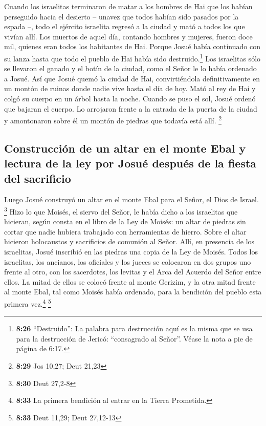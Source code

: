  Cuando los israelitas terminaron de matar a los hombres
de Hai que los habían perseguido hacia el desierto -- unavez que todos
habían sido pasados por la espada --, todo el ejército israelita regresó
a la ciudad y mató a todos los que vivían allí.  Los
muertos de aquel día, contando hombres y mujeres, fueron doce mil,
quienes eran todos los habitantes de Hai.  Porque Josué
había continuado con su lanza hasta que todo el pueblo de Hai había sido
destruido.\footnote{\textbf{8:26} ``Destruido'': La palabra para
  destrucción aquí es la misma que se usa para la destrucción de Jericó:
  ``consagrado al Señor''. Véase la nota a pie de página de 6:17.}
 Los israelitas sólo se llevaron el ganado y el botín de
la ciudad, como el Señor le lo había ordenado a Josué. 
Así que Josué quemó la ciudad de Hai, convirtiéndola definitivamente en
un montón de ruinas donde nadie vive hasta el día de hoy.
 Mató al rey de Hai y colgó su cuerpo en un árbol hasta
la noche. Cuando se puso el sol, Josué ordenó que bajaran el cuerpo. Lo
arrojaron frente a la entrada de la puerta de la ciudad y amontonaron
sobre él un montón de piedras que todavía está allí. \footnote{\textbf{8:29}
  Jos 10,27; Deut 21,23}

\hypertarget{construcciuxf3n-de-un-altar-en-el-monte-ebal-y-lectura-de-la-ley-por-josuuxe9-despuuxe9s-de-la-fiesta-del-sacrificio}{%
\subsection{Construcción de un altar en el monte Ebal y lectura de la
ley por Josué después de la fiesta del
sacrificio}\label{construcciuxf3n-de-un-altar-en-el-monte-ebal-y-lectura-de-la-ley-por-josuuxe9-despuuxe9s-de-la-fiesta-del-sacrificio}}

 Luego Josué construyó un altar en el monte Ebal para el
Señor, el Dios de Israel. \footnote{\textbf{8:30} Deut 27,2-8}
 Hizo lo que Moisés, el siervo del Señor, le había dicho
a los israelitas que hicieran, según consta en el libro de la Ley de
Moisés: un altar de piedras sin cortar que nadie hubiera trabajado con
herramientas de hierro. Sobre el altar hicieron holocaustos y
sacrificios de comunión al Señor.  Allí, en presencia de
los israelitas, Josué inscribió en las piedras una copia de la Ley de
Moisés.  Todos los israelitas, los ancianos, los
oficiales y los jueces se colocaron en dos grupos uno frente al otro,
con los sacerdotes, los levitas y el Arca del Acuerdo del Señor entre
ellos. La mitad de ellos se colocó frente al monte Gerizim, y la otra
mitad frente al monte Ebal, tal como Moisés había ordenado, para la
bendición del pueblo esta primera vez.\footnote{\textbf{8:33} La primera
  bendición al entrar en la Tierra Prometida.} \footnote{\textbf{8:33}
  Deut 11,29; Deut 27,12-13}

